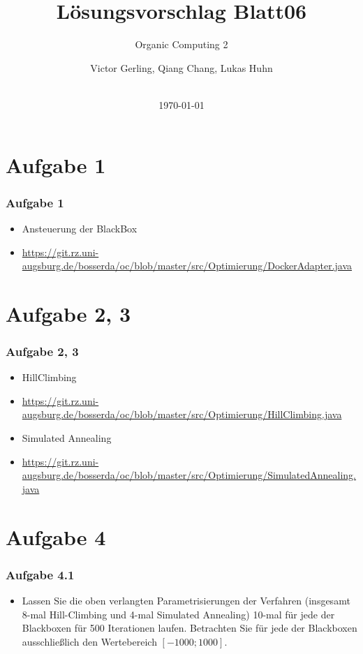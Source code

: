 \documentclass[xcolor=pdftex,dvipsnames,table]{beamer}
\title[]{Lösungsvorschlag Blatt06}
\subtitle{Organic Computing 2}
\author{Victor Gerling, Qiang Chang, Lukas Huhn}
\institute[Uni Augsburg]{Institut für Informatik, Lehrstuhl für Organic Computing}
\date[]{\\\today}
\begin{document}
\begin{frame}
  \titlepage
\end{frame}

\section*{Aufgabe 1}
\begin{frame}
  \frametitle{Aufgabe 1}
  \begin{itemize}
  		\item Ansteuerung der BlackBox
  	  \item \url{https://git.rz.uni-augsburg.de/bosserda/oc/blob/master/src/Optimierung/DockerAdapter.java}
  \end{itemize}
\end{frame}


\section*{Aufgabe 2, 3}
\begin{frame}
  \frametitle{Aufgabe 2, 3}
  \begin{itemize}
  		\item HillClimbing
  	  	\item \url{https://git.rz.uni-augsburg.de/bosserda/oc/blob/master/src/Optimierung/HillClimbing.java}
  	  	\item Simulated Annealing
  	  	\item \url{https://git.rz.uni-augsburg.de/bosserda/oc/blob/master/src/Optimierung/SimulatedAnnealing.java}
  \end{itemize}
\end{frame}


\section*{Aufgabe 4}

\begin{frame}
  \frametitle{Aufgabe 4.1}
  \begin{itemize}
  		\item Lassen Sie die oben verlangten Parametrisierungen der Verfahren (insgesamt 8-mal Hill-Climbing
und 4-mal Simulated Annealing) 10-mal für jede der Blackboxen für 500 Iterationen laufen. Betrachten
Sie für jede der Blackboxen ausschließlich den Wertebereich $[-1000; 1000]$.
  \end{itemize}
\end{frame}
\end{document}
